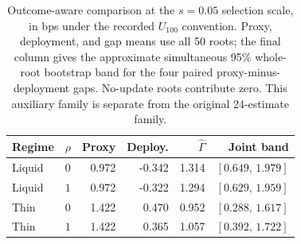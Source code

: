 \begin{table}[H]\centering\footnotesize
\begin{tabular}{llrrrr}\toprule
Regime & $\rho$ & Proxy & Deploy. & $\widehat\Gamma$ & Joint band \\
\midrule
Liquid & $0$ & 0.972 & -0.342 & 1.314 & $[0.649,\,1.979]$ \\
Liquid & $1$ & 0.972 & -0.322 & 1.294 & $[0.629,\,1.959]$ \\
Thin & $0$ & 1.422 & 0.470 & 0.952 & $[0.288,\,1.617]$ \\
Thin & $1$ & 1.422 & 0.365 & 1.057 & $[0.392,\,1.722]$ \\
\bottomrule\end{tabular}
\caption{Outcome-aware comparison at the $s=0.05$ selection scale, in bps under the recorded $U_{100}$ convention. Proxy, deployment, and gap means use all 50 roots; the final column gives the approximate simultaneous 95\% whole-root bootstrap band for the four paired proxy-minus-deployment gaps. No-update roots contribute zero. This auxiliary family is separate from the original 24-estimate family.}\label{tab:proxy-deployment-gap}
\end{table}
